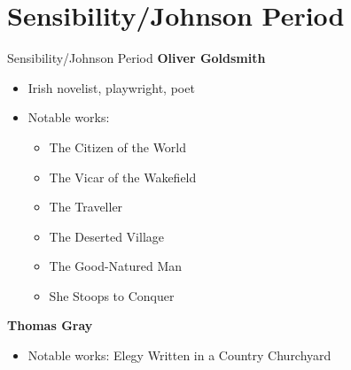 \documentclass[
  12pt,
    progressbar=frametitle]{beamer}
\providecommand{\tightlist}{%
  \setlength{\itemsep}{0pt}\setlength{\parskip}{0pt}}
\begin{document}
\section{Sensibility/Johnson Period}
\begin{frame}[allowframebreaks]
{Sensibility/Johnson Period}
\large\textbf{Oliver Goldsmith}\normalsize\vspace{-3mm}

\begin{itemize}
\tightlist
\item
  Irish novelist, playwright, poet
\item
  Notable works:

  \begin{itemize}
  \tightlist
  \item
    The Citizen of the World
  \item
    The Vicar of the Wakefield
  \item
    The Traveller
  \item
    The Deserted Village
  \item
    The Good-Natured Man
  \item
    She Stoops to Conquer
  \end{itemize}
\end{itemize}

\vspace{15mm}
\large\textbf{Thomas Gray}\normalsize\vspace{-3mm}

\begin{itemize}
\tightlist
\item
  Notable works: Elegy Written in a Country Churchyard
\end{itemize}

\end{frame}
\end{document}
